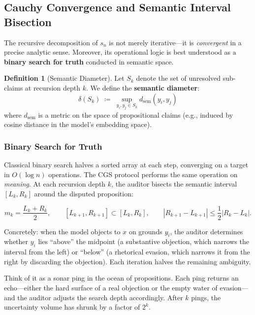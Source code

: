 \documentclass[11pt,a4paper]{article}
\theoremstyle{definition}
\newtheorem{definition}{Definition}[section]
\theoremstyle{plain}
\theoremstyle{remark}
\begin{document}
\subsection{Cauchy Convergence and Semantic Interval Bisection}\label{subsec:cauchy}

The recursive decomposition of $s_n$ is not merely iterative---it is \emph{convergent} in a precise analytic sense. Moreover, its operational logic is best understood as a \textbf{binary search for truth} conducted in semantic space.

\begin{definition}[Semantic Diameter]\label{def:diameter}
Let $S_k$ denote the set of unresolved sub-claims at recursion depth $k$. We define the \textbf{semantic diameter}:
\begin{equation}
  \delta(S_k) \;\coloneqq\; \sup_{y_i, y_j \in S_k} d_{\mathrm{sem}}(y_i, y_j)
\end{equation}
where $d_{\mathrm{sem}}$ is a metric on the space of propositional claims (e.g., induced by cosine distance in the model's embedding space).
\end{definition}

\subsubsection{Binary Search for Truth}\label{subsubsec:bisection}

Classical binary search halves a sorted array at each step, converging on a target in $O(\log n)$ operations. The CGS protocol performs the same operation on \emph{meaning}. At each recursion depth $k$, the auditor bisects the semantic interval $[L_k, R_k]$ around the disputed proposition:

\begin{equation}\label{eq:bisection}
  m_k = \frac{L_k + R_k}{2},
  \qquad
  [L_{k+1}, R_{k+1}] \subset [L_k, R_k],
  \qquad
  |R_{k+1} - L_{k+1}| \leq \frac{1}{2}|R_k - L_k|.
\end{equation}

Concretely: when the model objects to $x$ on grounds $y_i$, the auditor determines whether $y_i$ lies ``above'' the midpoint (a substantive objection, which narrows the interval from the left) or ``below'' (a rhetorical evasion, which narrows it from the right by discarding the objection). Each iteration halves the remaining ambiguity.

Think of it as a sonar ping in the ocean of propositions. Each ping returns an echo---either the hard surface of a real objection or the empty water of evasion---and the auditor adjusts the search depth accordingly. After $k$ pings, the uncertainty volume has shrunk by a factor of $2^k$.
\end{document}
